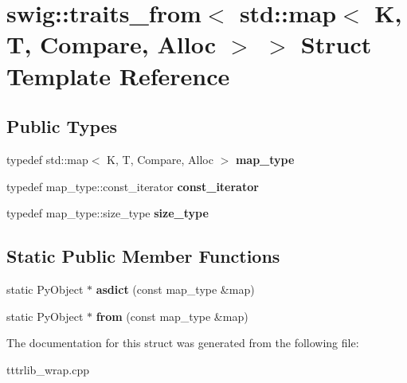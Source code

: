 \hypertarget{structswig_1_1traits__from_3_01std_1_1map_3_01_k_00_01_t_00_01_compare_00_01_alloc_01_4_01_4}{}\section{swig\+:\+:traits\+\_\+from$<$ std\+:\+:map$<$ K, T, Compare, Alloc $>$ $>$ Struct Template Reference}
\label{structswig_1_1traits__from_3_01std_1_1map_3_01_k_00_01_t_00_01_compare_00_01_alloc_01_4_01_4}
\subsection*{Public Types}
\begin{DoxyCompactItemize}
\item 
\mbox{\label{structswig_1_1traits__from_3_01std_1_1map_3_01_k_00_01_t_00_01_compare_00_01_alloc_01_4_01_4_a9b1b18fe3260445279169d47a71caf5f}} 
typedef std\+::map$<$ K, T, Compare, Alloc $>$ {\bfseries map\+\_\+type}
\item 
\mbox{\label{structswig_1_1traits__from_3_01std_1_1map_3_01_k_00_01_t_00_01_compare_00_01_alloc_01_4_01_4_a79bfdd6c1c4f9d06cc15348c56bfe5be}} 
typedef map\+\_\+type\+::const\+\_\+iterator {\bfseries const\+\_\+iterator}
\item 
\mbox{\label{structswig_1_1traits__from_3_01std_1_1map_3_01_k_00_01_t_00_01_compare_00_01_alloc_01_4_01_4_aff705e529c0e316017d57d0e99396ac5}} 
typedef map\+\_\+type\+::size\+\_\+type {\bfseries size\+\_\+type}
\end{DoxyCompactItemize}
\subsection*{Static Public Member Functions}
\begin{DoxyCompactItemize}
\item 
\mbox{\label{structswig_1_1traits__from_3_01std_1_1map_3_01_k_00_01_t_00_01_compare_00_01_alloc_01_4_01_4_a27e1b651c802e7e0cd31e835da1158f1}} 
static Py\+Object $\ast$ {\bfseries asdict} (const map\+\_\+type \&map)
\item 
\mbox{\label{structswig_1_1traits__from_3_01std_1_1map_3_01_k_00_01_t_00_01_compare_00_01_alloc_01_4_01_4_a215ce375f295de427bb6a6b51862ca7c}} 
static Py\+Object $\ast$ {\bfseries from} (const map\+\_\+type \&map)
\end{DoxyCompactItemize}


The documentation for this struct was generated from the following file\+:\begin{DoxyCompactItemize}
\item 
tttrlib\+\_\+wrap.\+cpp\end{DoxyCompactItemize}
